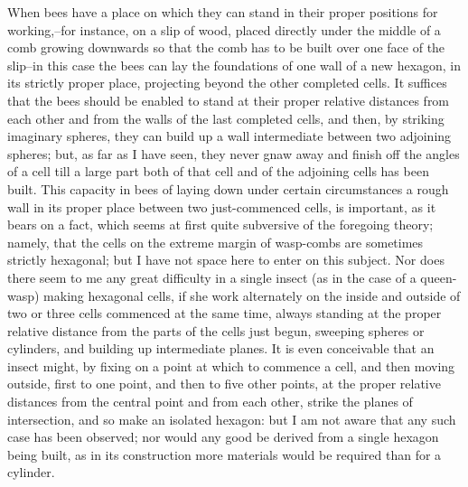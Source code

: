 When bees have a place on which they can stand in their proper positions for working,--for instance, on a slip of wood, placed directly under the middle of a comb growing downwards so that the comb has to be built over one face of the slip--in this case the bees can lay the foundations of one wall of a new hexagon, in its strictly proper place, projecting beyond the other completed cells. It suffices that the bees should be enabled to stand at their proper relative distances from each other and from the walls of the last completed cells, and then, by striking imaginary spheres, they can build up a wall intermediate between two adjoining spheres; but, as far as I have seen, they never gnaw away and finish off the angles of a cell till a large part both of that cell and of the adjoining cells has been built. This capacity in bees of laying down under certain circumstances a rough wall in its proper place between two just-commenced cells, is important, as it bears on a fact, which seems at first quite subversive of the foregoing theory; namely, that the cells on the extreme margin of wasp-combs are sometimes strictly hexagonal; but I have not space here to enter on this subject. Nor does there seem to me any great difficulty in a single insect (as in the case of a queen-wasp) making hexagonal cells, if she work alternately on the inside and outside of two or three cells commenced at the same time, always standing at the proper relative distance from the parts of the cells just begun, sweeping spheres or cylinders, and building up intermediate planes. It is even conceivable that an insect might, by fixing on a point at which to commence a cell, and then moving outside, first to one point, and then to five other points, at the proper relative distances from the central point and from each other, strike the planes of intersection, and so make an isolated hexagon: but I am not aware that any such case has been observed; nor would any good be derived from a single hexagon being built, as in its construction more materials would be required than for a cylinder.

